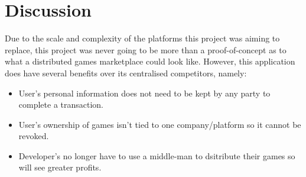 \section{Discussion}

Due to the scale and complexity of the platforms this project was aiming to replace, this project was never going to be more than a proof-of-concept as to what a distributed games marketplace could look like. 
However, this application does have several benefits over its centralised competitors, namely:

\begin{itemize}
  \item User's personal information does not need to be kept by any party to complete a transaction. 
  \item User's ownership of games isn't tied to one company/platform so it cannot be revoked.
  \item Developer's no longer have to use a middle-man to dsitribute their games so will see greater profits.
\end{itemize}
